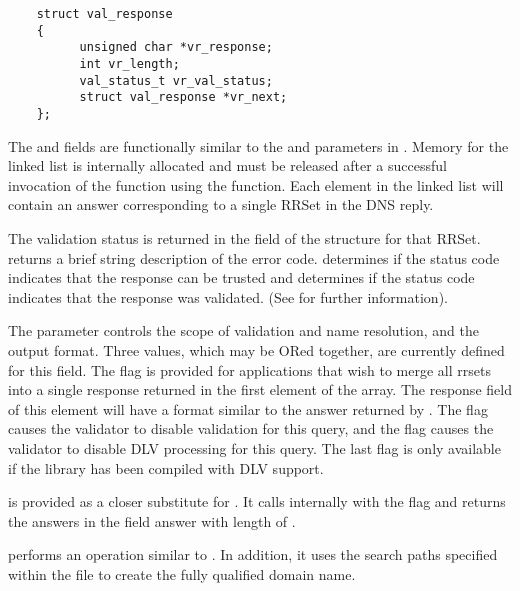 \begin{verbatim}
    struct val_response
    {
          unsigned char *vr_response;
          int vr_length;
          val_status_t vr_val_status;
          struct val_response *vr_next;
    };
\end{verbatim}

The  and  fields are functionally similar to
the  and  parameters in .  Memory
for the  linked list is internally allocated and must be released
after a successful invocation of the function using the
 function.  Each element in the  linked
list will contain an answer corresponding to a single RRSet in the DNS reply.

The validation status is returned in the  field of the
 structure for that RRSet.   returns
a brief string description of the error code.  
determines if the status code indicates that the response can be trusted and
 determines if the status code indicates that the
response was validated.  (See  for further information).

The  parameter controls the scope of validation and name
resolution, and the output format.  Three values, which may be ORed together,
are currently defined for this field.  The 
flag is provided for applications that wish to merge all rrsets into a single
response returned in the first element of the  array.  The response
field of this element will have a format similar to the answer returned by
.  The  flag causes the
validator to disable validation for this query, and the
 flag causes the validator to disable DLV
processing for this query.  The last flag is only available if the
 library has been compiled with DLV support.

 is provided as a closer substitute for
.  It calls  internally with the
 flag and returns the answers in the field
answer with length of .

 performs an operation similar to
.  In addition, it uses the search paths specified
within the  file to create the fully qualified domain
name.

